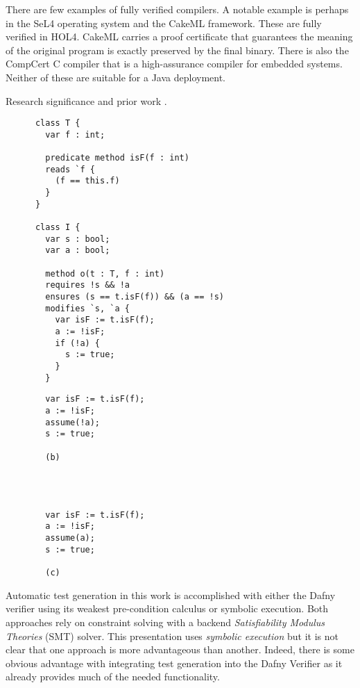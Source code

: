 \documentclass[11pt,onecolumn,notitlepage]{article}
\begin{document}
There are few examples of fully verified compilers. A notable example is perhaps in the SeL4 operating system and the CakeML framework. These are fully verified in HOL4. CakeML carries a proof certificate that guarantees the meaning of the original program is exactly preserved by the final binary. There is also the CompCert C compiler that is a high-assurance compiler for embedded systems. Neither of these are suitable for a Java deployment.

Research significance and prior work \cite{8972014}.

\newsavebox{\boxa}
\begin{lrbox}{\boxa}
    \begin{lstlisting}
      class T {
        var f : int;

        predicate method isF(f : int)
        reads `f {
          (f == this.f)
        }
      }
      
      class I {
        var s : bool;
        var a : bool;

        method o(t : T, f : int)
        requires !s && !a
        ensures (s == t.isF(f)) && (a == !s) 
        modifies `s, `a {
          var isF := t.isF(f);
          a := !isF;
          if (!a) {
            s := true;
          }
        }
    \end{lstlisting}
\end{lrbox}

\newsavebox{\boxb}
\begin{lrbox}{\boxb}
    \begin{lstlisting}
        var isF := t.isF(f);
        a := !isF;
        assume(!a);
        s := true;

        (b)




        var isF := t.isF(f);
        a := !isF;
        assume(a);
        s := true;

        (c)
    \end{lstlisting}
\end{lrbox}

Automatic test generation in this work is accomplished with either the Dafny verifier using its weakest pre-condition calculus or symbolic execution. Both approaches rely on constraint solving with a backend \emph{Satisfiability Modulus Theories} (SMT) solver. This presentation uses \emph{symbolic execution} but it is not clear that one approach is more advantageous than another. Indeed, there is some obvious advantage with integrating test generation into the Dafny Verifier as it already provides much of the needed functionality.
\end{document}
